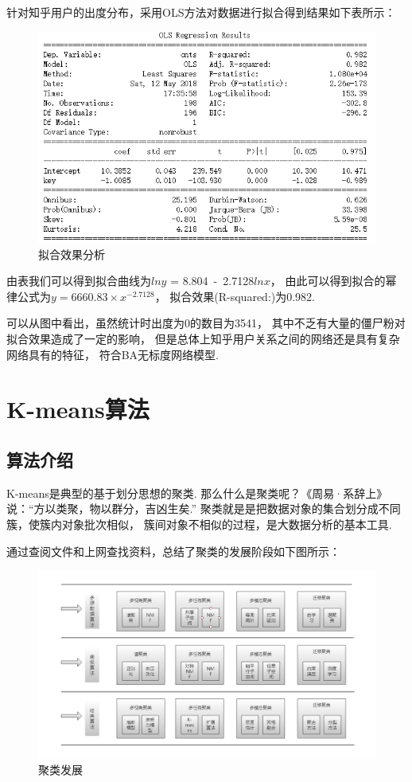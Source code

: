 \documentclass[bachelor,adobefonts]{jnuthesis}
\begin{document}
针对知乎用户的出度分布，采用OLS方法对数据进行拟合得到结果如下表所示：
\begin{figure}[h!]
  \centering
  \includegraphics[width=0.8\linewidth]{Wnihejieguo.png}
  \caption{拟合效果分析}
\end{figure}

由表我们可以得到拟合曲线为$lny$ = 8.804\ -\ 2.7128$lnx$，
由此可以得到拟合的幂律公式为$y = 6660.83 \times x^{-2.7128}$，
拟合效果(R-squared:)为0.982.

可以从图中看出，虽然统计时出度为0的数目为3541，
其中不乏有大量的僵尸粉对拟合效果造成了一定的影响，
但是总体上知乎用户关系之间的网络还是具有复杂网络具有的特征，
符合BA无标度网络模型.



\section{K-means算法}
\subsection{算法介绍}
K-means是典型的基于划分思想的聚类.
那么什么是聚类呢？《周易·系辞上》说：“方以类聚，物以群分，吉凶生矣.”
聚类就是是把数据对象的集合划分成不同簇，使簇内对象批次相似，
簇间对象不相似的过程，是大数据分析的基本工具.

通过查阅文件和上网查找资料，总结了聚类的发展阶段如下图所示：

\begin{figure}[h!]
  \centering
    \includegraphics[width=1.0\linewidth]{Wjuleifazhan.png}
  \caption{聚类发展}
\end{figure}
\end{document}
